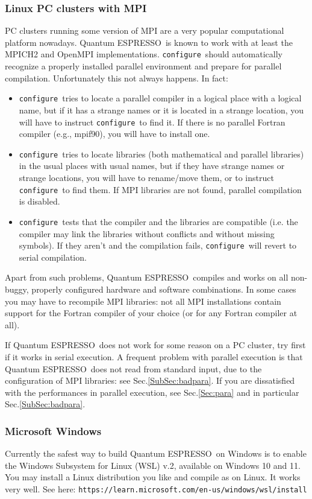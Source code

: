 \documentclass[12pt,a4paper]{article}
\def\qe{{\sc Quantum ESPRESSO}}
\def\configure{\texttt{configure}}
\begin{document}
\subsubsection{Linux PC clusters with MPI}
\label{SubSec:LinuxPCMPI}
PC clusters running some version of MPI are a very popular
computational platform nowadays. \qe\ is known to work
with at least the MPICH2 and OpenMPI implementations.
\configure\ should automatically recognize a properly installed
parallel environment and prepare for parallel compilation.
Unfortunately this not always happens. In fact:
\begin{itemize}
\item \configure\ tries to locate a parallel compiler in a logical
  place with a logical name, but if it has a strange names or it is
  located  in a strange location, you will have to instruct \configure\
  to find it. If there is no parallel Fortran compiler (e.g., mpif90),
  you will have to install one.
\item \configure\ tries to locate libraries (both mathematical and
  parallel libraries) in the usual places with usual names, but if
  they have strange names or strange locations, you will have to
  rename/move them, or to instruct \configure\ to find them. If MPI
  libraries are not found, parallel compilation is disabled.
\item \configure\ tests that the compiler and the libraries are
  compatible (i.e. the compiler may link the libraries without
  conflicts and without missing symbols). If they aren't and the
  compilation fails, \configure\ will revert to serial compilation.
\end{itemize}

Apart from such problems, \qe\ compiles and works on all non-buggy, properly
configured hardware and software combinations. In some cases you may have to
recompile MPI libraries: not all MPI installations contain support for
the Fortran compiler of your choice (or for any Fortran compiler
at all).

If \qe\ does not work for some reason on a PC cluster,
try first if it works in serial execution. A frequent problem with parallel
execution is that \qe\ does not read from standard input,
due to the configuration of MPI libraries: see Sec.\ref{SubSec:badpara}.
If you are dissatisfied with the performances in parallel execution,
see Sec.\ref{Sec:para} and in particular Sec.\ref{SubSec:badpara}.

\subsubsection{Microsoft Windows}
\label{SubSec:Windows}
Currently the safest way to build \qe\ on Windows is to enable the
Windows Subsystem for Linux (WSL) v.2, available on Windows 10 and 11.
You may install a Linux distribution you like and compile as on Linux. 
It works very well. See here:
\texttt{https://learn.microsoft.com/en-us/windows/wsl/install}
\end{document}
